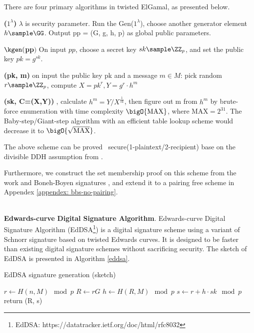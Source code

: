 \documentclass{article}
\begin{document}
There are four primary algorithms in twisted ElGamal, as presented below.

\textbf{\pgen($1^\lambda$)} $\lambda$ is security parameter.  Run the Gen($1^\lambda$), choose another generator element $h \sample \GG$. Output pp = (G, g, h, p) as global public parameters.

\textbf{$\kgen($pp$)$} On input $pp$, choose a secret key $sk \sample \ZZ_p$, and set the public key $pk = g^{sk}$.

\textbf{\enc(pk, m)} on input the public key pk and a message $m \in  M$: pick random $r \sample \ZZ_p$, compute $X=pk^r, Y = g^r \cdot h^m$

\textbf{\dec(sk, C=(X,Y))} , calculate $h^m = {Y}/{X^{\frac{1}{sk}}}$,  then figure out m from $h^m$ by brute-force enumeration with time complexity $\bigO{\mbox{MAX}}$, where $\mbox{MAX}=2^{31}$. The Baby-step/Giant-step algorithm \cite{Shanks1971ClassNA} with an efficient table lookup scheme would decrease it to $\bigO{\sqrt{\mbox{MAX}}}$.

The above scheme can be proved \indcpa\ secure(1-plaintext/2-recipient) base on the divisible DDH assumption from \cite{chen2020pgc}.

Furthermore, we construct the set membership proof on this scheme from the work \cite{camenisch2008efficient} and Boneh-Boyen signatures \cite{jao2009boneh}, and extend it to a pairing free scheme in Appendex \ref{appendex: bbs-no-pairing}.

~\\
\noindent\textbf{Edwards-curve Digital Signature Algorithm}. Edwards-curve Digital Signature Algorithm (EdDSA\footnote{EdDSA: https://datatracker.ietf.org/doc/html/rfc8032}) is a digital signature scheme using a variant of Schnorr signature based on twisted Edwards curves. It is designed to be faster than existing digital signature schemes without sacrificing security. The sketch of EdDSA is presented in Algorithm \ref{eddsa}.

\begin{algorithm}
 \caption{EdDSA signature generation (sketch)}
 \label{eddsa}
 \LinesNumbered
 
 $r \gets H(n, M) \mod{p}$ \;
 $R \gets rG$ \;
 $h \gets H(R, M) \mod{p}$ \;
 $s \gets r + h \cdot sk \mod{p}$ \;
  return (R, s)
\end{algorithm}
\end{document}
